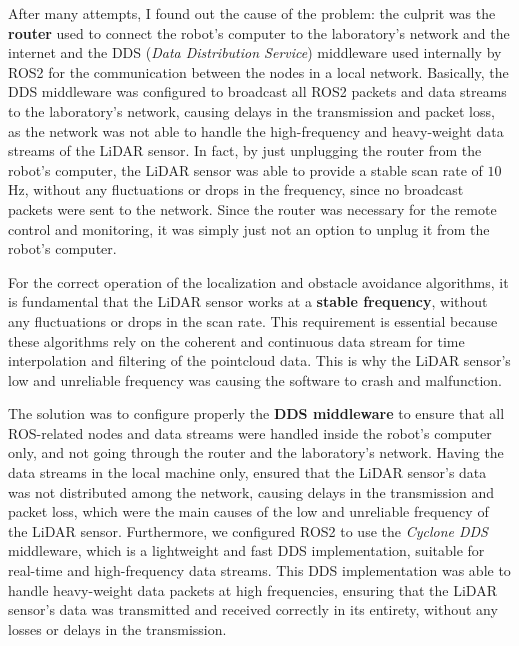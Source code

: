 After many attempts, I found out the cause of the problem: the culprit was the \textbf{router}
used to connect the robot's computer
to the laboratory's network and the internet and the DDS (\textit{Data Distribution Service}) middleware used 
internally by ROS2 for the communication between the nodes in a local network. Basically, the DDS middleware
was configured to broadcast all ROS2 packets and data streams to the laboratory's network, causing delays in the transmission
and packet loss, as the network was not able to handle the high-frequency and heavy-weight data streams of the LiDAR sensor.
In fact, by just unplugging the router from the robot's computer, the LiDAR sensor was able to provide a stable scan rate
of $10$Hz, without any fluctuations or drops in the frequency, since no broadcast packets were sent to the network.
Since the router was necessary for the remote control and monitoring, it was simply just not an option
to unplug it from the robot's computer.

For the correct operation of the localization and obstacle 
avoidance algorithms, it is fundamental that the LiDAR sensor works at a \textbf{stable frequency}, 
without any fluctuations or drops in the scan rate. This requirement is essential because these algorithms rely on the
coherent and continuous data stream for time interpolation and filtering of the pointcloud data.
This is why the LiDAR sensor's low and unreliable frequency was causing the software to crash and malfunction.

The solution was to configure properly the \textbf{DDS middleware} to ensure that all ROS-related nodes and data streams
were handled inside the robot's computer only, and not going through the router and the laboratory's network.
Having the data streams in the local machine only, ensured that the LiDAR sensor's data was not distributed 
among the network, causing delays in the transmission and packet loss, which were the main causes of the low and unreliable
frequency of the LiDAR sensor. Furthermore, we configured ROS2 to use the \textit{Cyclone DDS} middleware, which is a lightweight
and fast DDS implementation, suitable for real-time and high-frequency data streams. This DDS implementation was able to handle
heavy-weight data packets at high frequencies, ensuring that the LiDAR sensor's data was transmitted and received correctly
in its entirety, without any losses or delays in the transmission.

